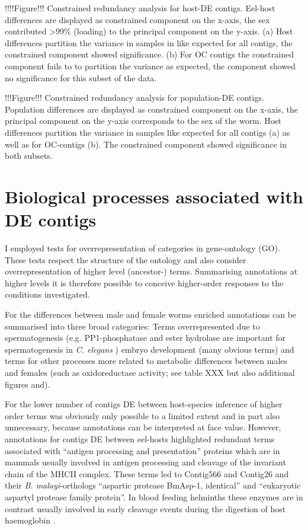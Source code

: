 \documentclass[10pt]{article}
\begin{document}
!!!!Figure!!! Constrained redundancy analysis for host-DE
contigs. Eel-host differences are displayed as constrained component
on the x-axis, the sex contributed >99\% (loading) to the principal
component on the y-axis. (a) Host differences partition the variance
in samples in like expected for all contigs, the constrained component
showed significance. (b) For OC contigs the constrained component
fails to to partition the variance as expected, the component showed
no significance for this subset of the data.

!!!Figure!!! Constrained redundancy analysis for population-DE
contigs. Population differences are displayed as constrained component
on the x-axis, the principal component on the y-axis corresponds to
the sex of the worm. Host differences partition the variance in
samples like expected for all contigs (a) as well as for OC-contigs
(b). The constrained component showed significance in both subsets.

\section{Biological processes associated with DE contigs}

I employed tests for overrepresentation of categories in
gene-ontology (GO). These tests respect the structure of the ontology
and also consider overrepresentation of higher level (ancestor-)
terms. Summarising annotations at higher levels it is therefore
possible to conceive higher-order responses to the conditions
investigated.

For the differences between male and female worms enriched annotations
can be summarised into three broad categories: Terms overrepresented
due to spermatogenesis (e.g. PP1-phosphatase and ester hydrolase are
important for spermatogenesis in \textit{C. elegans}
\cite{wormbook_sperm, fardilha2011protein}) embryo development (many
obvious terms) and terms for other processes more related to metabolic
differences between males and females (such as oxidoreductase
activity; see table XXX but also additional figures and).

For the lower number of contigs DE between host-species inference of
higher order terms was obviously only possible to a limited extent and
in part also unnecessary, because annotations can be interpreted at
face value. However, annotations for contigs DE between eel-hosts
highlighted redundant terms associated with ``antigen processing and
presentation'' proteins which are in mammals usually involved in
antigen processing and cleavage of the invariant chain of the MHCII
complex. These terms led to Contig566 and Contig26 and their
\textit{B. malayi}-orthologs ``aspartic protease BmAsp-1, identical''
and ``eukaryotic aspartyl protease family protein''. In blood feeding
helminths these enzymes are in contrast usually involved in early
cleavage events during the digestion of host haemoglobin
\cite{pmid12782060}.
\end{document}
